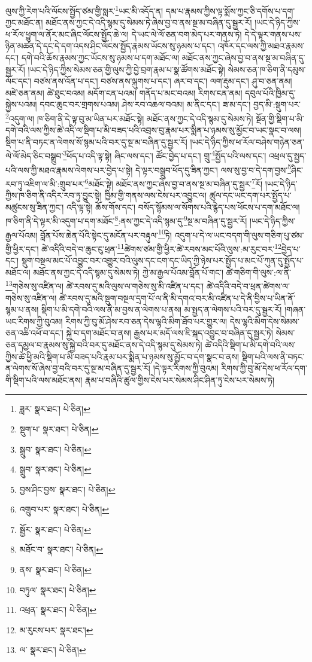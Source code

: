 ལུས་ཀྱི་རེག་པའི་ལོངས་སྤྱོད་ཙམ་གྱི་སླར་\footnote{ཟླར་  སྣར་ཐང་།  པེ་ཅིན། }ཡང་མི་འདོད་ན། དམ་པ་རྣམས་ཀྱིས་ལྟ་སྨོས་ཀྱང་ཅི་དགོས་པ་དག་ཀྱང་མཐོང་ན། མཐོང་ནས་ཀྱང་དེ་འདི་སྙམ་དུ་སེམས་ཏེ་ཞེས་བྱ་བ་ནས་སྔ་མ་བཞིན་དུ་སྦྱར་རོ། །ཡང་དེ་ཉིད་ཀྱིས་ཕ་རོལ་ཕྱུག་ལ་ནོར་མང་ཞིང་ལོངས་སྤྱོད་ཆེ་ལ། དེ་ཡང་ལེ་ལོ་ཅན་བག་མེད་པར་གནས་ཏེ། དེ་དེ་ལྟར་གནས་པས་ཉིན་མཚན་དེ་དང་དེ་དག་འདས་ཤིང་ལོངས་སྤྱོད་རྣམས་ཡོངས་སུ་ཉམས་པ་དང་། འཁོར་དང་ལས་ཀྱི་མཐའ་རྣམས་དང་། དགེ་བའི་ཆོས་རྣམས་ཀྱང་ཡོངས་སུ་ཉམས་པ་དག་མཐོང་ལ། མཐོང་ནས་ཀྱང་ཞེས་བྱ་བ་ནས་སྔ་མ་བཞིན་དུ་སྦྱར་རོ། །ཡང་དེ་ཉིད་ཀྱིས་སེམས་ཅན་གྱི་ལུས་ཀྱི་བྱེ་བྲག་རྣམ་པ་སྣ་ཚོགས་མཐོང་སྟེ། སེམས་ཅན་ཁ་ཅིག་ནི་དམུས་ལོང་དང་། བཙས་ནས་འོན་པ་དང་། བཙས་ནས་ལྐུགས་པ་དང་། ཞར་བ་དང་། ལག་རྡུམ་དང་། ཤུ་བ་ཅན་ནམ། མཛེ་ཅན་ནམ། ཚེ་ཐུང་བའམ། མདོག་ངན་པའམ། གནོད་པ་མང་བའམ། རིགས་ངན་ནམ། དབུལ་པོའི་ཁྱིམ་དུ་སྐྱེས་པའམ། དབང་ཆུང་བར་གྲགས་པའམ། ཤེས་རབ་འཆལ་བའམ། མ་ནིང་དང་། ཟ་མ་དང་། བྱད་མི་:སྡུག་པར་\footnote{སྡུག་པ་  སྣར་ཐང་།  པེ་ཅིན། }འདུག་ལ། ཁ་ཅིག་ནི་དེ་ལྟ་བུ་མ་ཡིན་པར་མཐོང་སྟེ། མཐོང་ནས་ཀྱང་དེ་འདི་སྙམ་དུ་སེམས་ཏེ། སྔོན་གྱི་སྡིག་པ་མི་དགེ་བའི་ལས་ཀྱིས་ཚེ་འདི་ལ་སྡིག་པ་མི་བཟད་པའི་འབྲས་བུ་རྣམ་པར་སྨིན་པ་ཉམས་སུ་མྱོང་བ་ཡང་སྣང་བ་ལས། སྡིག་པ་ནི་བཏང་ན་ལེགས་སོ་སྙམ་པའི་བར་དུ་སྔ་མ་བཞིན་དུ་སྦྱར་རོ། །ཡང་དེ་ཉིད་ཀྱིས་ཕ་རོལ་བཤེས་གཉེན་ཅན་ལེ་ལོ་མེད་ཅིང་བསྒྲུབ་\footnote{སྒྲུབ་  སྣར་ཐང་།  པེ་ཅིན། }ཕོད་པ་འདི་ལྟ་སྟེ། ཞིང་ལས་དང་། ཚོང་བྱེད་པ་དང་། གྲུ་\footnote{སྒྲུབ་  སྣར་ཐང་།  པེ་ཅིན། }སྤྱོད་པའི་ལས་དང་། འཕྲལ་དུ་སྤྱད་པའི་ལས་ཀྱི་མཐའ་རྣམས་ལེགས་པར་བྱེད་པ་སྟེ། དེ་ལྟར་བསྒྲུབ་ཕོད་དུ་ཟིན་ཀྱང་། ལས་སུ་བྱ་བ་དེ་དག་བྱས་\footnote{བྱས་ཤིང་བྱས་  སྣར་ཐང་།  པེ་ཅིན། }ཤིང་རབ་ཏུ་འཇིག་ལ་མི་:གྲུབ་པར་\footnote{འགྲུབ་པར་  སྣར་ཐང་།  པེ་ཅིན། }མཐོང་སྟེ། མཐོང་ནས་ཀྱང་ཞེས་བྱ་བ་ནས་སྔ་མ་བཞིན་དུ་སྦྱར་\footnote{སྦྱོར་  སྣར་ཐང་།  པེ་ཅིན། }རོ། །ཡང་དེ་ཉིད་ཀྱིས་ཁ་ཅིག་ནི་འདིར་རབ་ཏུ་བྱུང་སྟེ། ཁྱིམ་གྱི་གནས་ལས་ངེས་པར་འབྱུང་ལ། ཚུལ་དང་ཡང་དག་པར་སྤྱོད་པ་མཚུངས་སུ་ཟིན་ཀྱང་། འདི་ལྟ་སྟེ། ཆོས་གོས་དང་། བསོད་སྙོམས་ལ་སོགས་པའི་རྙེད་པས་ཕོངས་པ་དག་མཐོང་ལ། ཁ་ཅིག་ནི་དེ་ལྟར་མི་འདུག་པ་དག་མཐོང་\footnote{མཐོང་བ་  སྣར་ཐང་།  པེ་ཅིན། }:ནས་ཀྱང་དེ་འདི་སྙམ་དུ་\footnote{ནས་  སྣར་ཐང་།  པེ་ཅིན། }སྔ་མ་བཞིན་དུ་སྦྱར་རོ། །ཡང་དེ་ཉིད་ཀྱིས་རྒྱལ་པོའམ། བློན་པོས་ཆེན་པོའི་སྟེང་དུ་མངོན་པར་བརྟུལ་\footnote{བཏུལ་  སྣར་ཐང་།  པེ་ཅིན། }ཏེ། འདུག་པ་དེ་ལ་ཡང་བདག་གི་ལུས་གཅིག་པུ་ཙམ་གྱི་ཕྱིར་དང་། ཚེ་འདིའི་བདེ་བ་ཆུང་ངུ་ཕྲན་\footnote{འཕྲན་  སྣར་ཐང་།  པེ་ཅིན། }ཚེགས་ཙམ་གྱི་ཕྱིར་ཚེ་རབས་མང་པོའི་ལུས་:མ་རུང་བར་\footnote{མ་རུངས་པར་  སྣར་ཐང་། }བྱེད་པ་དང་། སྡུག་བསྔལ་མང་པོ་འབྱུང་བར་འགྱུར་བའི་ལུས་དང་ངག་དང་ཡིད་ཀྱི་ཉེས་པར་སྤྱོད་པ་མང་པོ་ཀུན་དུ་སྤྱོད་པ་མཐོང་ལ། མཐོང་ནས་ཀྱང་དེ་འདི་སྙམ་དུ་སེམས་ཏེ། ཀྱེ་མ་རྒྱལ་པོའམ་བློན་པོ་གང་། ཚེ་གཅིག་གི་ལུས་:ལ་ནི་\footnote{ལ་  སྣར་ཐང་།  པེ་ཅིན། }གཅེས་སུ་འཛིན་ལ། ཚེ་རབས་དུ་མའི་ལུས་ལ་གཅེས་སུ་མི་འཛིན་པ་དང་། ཚེ་འདིའི་བདེ་བ་ཕྲན་ཚེགས་ལ་གཅེས་སུ་འཛིན་ལ། ཚེ་རབས་དུ་མའི་སྡུག་བསྔལ་དྲག་པོ་ལ་ནི་མི་དགའ་བར་མི་འཛིན་པ་དེ་ནི་བྱིས་པ་ཡིན་ནོ་སྙམ་པ་ནས། སྡིག་པ་མི་དགེ་བའི་ལས་ནི་མ་བྱས་ན་ལེགས་པ་ནས། མ་སྤྱད་ན་ལེགས་པའི་བར་དུ་སྦྱར་རོ། །གཞན་ཡང་རིགས་ཀྱི་བུའམ། རིགས་ཀྱི་བུ་མོ་ཤེས་རབ་ཅན་དེས་ལྷའི་མིག་ཐོབ་པར་གྱུར་ལ། དེས་ལྷའི་མིག་དེས་སེམས་ཅན་འཆི་འཕོ་བ་དང་། སྐྱེ་བ་དག་མཐོང་བ་ནས། རྒྱས་པར་མདོ་ལས་ཇི་སྐད་འབྱུང་བ་བཞིན་དུ་སྦྱར་ཏེ། སེམས་ཅན་དམྱལ་བ་རྣམས་སུ་སྐྱེ་བའི་བར་དུ་མཐོང་ནས་དེ་འདི་སྙམ་དུ་སེམས་ཏེ། ཚེ་འདིའི་སྡིག་པ་མི་དགེ་བའི་ལས་ཀྱིས་ཚེ་ཕྱི་མའི་སྡིག་པ་མི་བཟད་པའི་རྣམ་པར་སྨིན་པ་ཉམས་སུ་མྱོང་བ་དག་སྣང་བ་ནས། སྡིག་པའི་ལས་ནི་བཏང་ན་ལེགས་སོ་ཞེས་བྱ་བའི་བར་དུ་སྔ་མ་བཞིན་དུ་སྦྱར་རོ། །དེ་ལྟར་རིགས་ཀྱི་བུའམ། རིགས་ཀྱི་བུ་མོ་དེས་ཕ་རོལ་དག་གི་སྡིག་པའི་ལས་མཐོང་ནས། རྣམ་པ་བཞིའི་ཚུལ་གྱིས་ངེས་པར་སེམས་ཤིང་ཤིན་ཏུ་ངེས་པར་སེམས་ཏེ། 